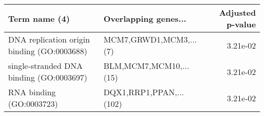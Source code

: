 \begin{tabular}{llr}
\toprule
                              Term name (4) &    Overlapping genes... &  Adjusted p-value \\
\midrule
DNA replication origin binding (GO:0003688) &  MCM7,GRWD1,MCM3,...(7) &          3.21e-02 \\
   single-stranded DNA binding (GO:0003697) &  BLM,MCM7,MCM10,...(15) &          3.21e-02 \\
                   RNA binding (GO:0003723) & DQX1,RRP1,PPAN,...(102) &          3.21e-02 \\
\bottomrule
\end{tabular}

